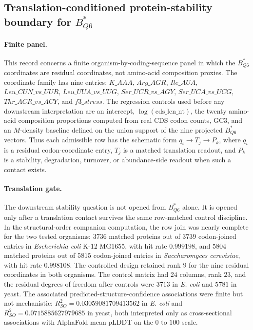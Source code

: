 \subsection{Translation-conditioned protein-stability boundary for $B^{*}_{Q6}$}
\label{sec:q6-translation-conditioned-protein-stability-boundary}

\paragraph{Finite panel.}
This record concerns a finite organism-by-coding-sequence panel in which the $B^{*}_{Q6}$ coordinates are residual coordinates, not amino-acid composition proxies.  The coordinate family has nine entries: $K\_AAA$, $Arg\_AGR$, $Ile\_AUA$, $Leu\_CUN\_vs\_UUR$, $Leu\_UUA\_vs\_UUG$, $Ser\_UCR\_vs\_AGY$, $Ser\_UCA\_vs\_UCG$, $Thr\_ACR\_vs\_ACY$, and $f3\_stress$.  The regression controls used before any downstream interpretation are an intercept, $\log(\mathrm{cds\_len\_nt})$, the twenty amino-acid composition proportions computed from real CDS codon counts, GC3, and an $M$-density baseline defined on the union support of the nine projected $B^{*}_{Q6}$ vectors.  Thus each admissible row has the schematic form $q_i \to T_j \to P_k$, where $q_i$ is a residual codon-coordinate entry, $T_j$ is a matched translation readout, and $P_k$ is a stability, degradation, turnover, or abundance-side readout when such a contact exists.

\paragraph{Translation gate.}
The downstream stability question is not opened from $B^{*}_{Q6}$ alone.  It is opened only after a translation contact survives the same row-matched control discipline.  In the structural-order companion computation, the row join was nearly complete for the two tested organisms: $3736$ matched proteins out of $3739$ codon-joined entries in \emph{Escherichia coli} K-12 MG1655, with hit rate $0.999198$, and $5804$ matched proteins out of $5815$ codon-joined entries in \emph{Saccharomyces cerevisiae}, with hit rate $0.998108$.  The controlled design retained rank $9$ for the nine residual coordinates in both organisms.  The control matrix had $24$ columns, rank $23$, and the residual degrees of freedom after controls were $3713$ in \emph{E. coli} and $5781$ in yeast.  The associated predicted-structure-confidence associations were finite but not mechanistic: $R^2_{SO}=0.03059081709413562$ in \emph{E. coli} and $R^2_{SO}=0.0715885627979685$ in yeast, both interpreted only as cross-sectional associations with AlphaFold mean pLDDT on the $0$ to $100$ scale.

